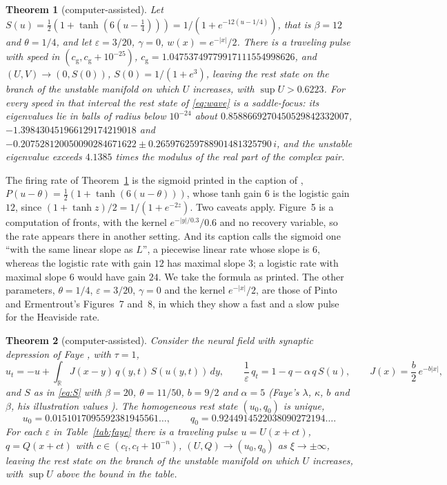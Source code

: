 \documentclass[11pt]{article}
\newtheorem{theorem}{Theorem}
\theoremstyle{definition}
\newcommand{\R}{\mathbb{R}}
\newcommand{\eps}{\varepsilon}
\begin{document}
\begin{theorem}[computer-assisted]\label{thm:gain12}
Let $S(u) = \frac12(1 + \tanh(6(u - \frac14))) = 1/(1 + e^{-12(u - 1/4)})$, that is $\beta = 12$ and $\theta = 1/4$, and let $\eps = 3/20$, $\gamma = 0$, $w(x) = e^{-|x|}/2$. There is a traveling pulse with speed in $(c_{\mathrm g}, c_{\mathrm g} + 10^{-25})$, $c_{\mathrm g} = 1.04753749779917111554998626$, and $(U, V) \to (0, S(0))$, $S(0) = 1/(1 + e^3)$, leaving the rest state on the branch of the unstable manifold on which $U$ increases, with $\sup U > 0.6223$. For every speed in that interval the rest state of \eqref{eq:wave} is a saddle-focus: its eigenvalues lie in balls of radius below $10^{-24}$ about $0.8588669270450529842332007$, $-1.398430451966129174219018$ and $-0.207528120050090284671622 \pm 0.265976259788901481325790\,i$, and the unstable eigenvalue exceeds $4.1385$ times the modulus of the real part of the complex pair.
\end{theorem}

The firing rate of Theorem~\ref{thm:gain12} is the sigmoid printed in the caption of \cite[Fig.~5, p.~215]{pe2001}, $P(u - \theta) = \frac12(1 + \tanh(6(u - \theta)))$, whose tanh gain $6$ is the logistic gain $12$, since $(1 + \tanh z)/2 = 1/(1 + e^{-2z})$. Two caveats apply. Figure~5 is a computation of fronts, with the kernel $e^{-|y|/0.3}/0.6$ and no recovery variable, so the rate appears there in another setting. And its caption calls the sigmoid one ``with the same linear slope as $L$'', a piecewise linear rate whose slope is $6$, whereas the logistic rate with gain $12$ has maximal slope $3$; a logistic rate with maximal slope $6$ would have gain $24$. We take the formula as printed. The other parameters, $\theta = 1/4$, $\eps = 3/20$, $\gamma = 0$ and the kernel $e^{-|x|}/2$, are those of Pinto and Ermentrout's Figures~7 and~8, in which they show a fast and a slow pulse for the Heaviside rate.

\begin{theorem}[computer-assisted]\label{thm:faye}
Consider the neural field with synaptic depression of Faye \cite[eqs.~(2.1)--(2.3)]{faye2013}, with $\tau = 1$,
\begin{equation}\label{eq:faye}
  u_t = -u + \int_\R J(x - y)\, q(y, t)\, S(u(y, t))\, dy, \qquad \frac{1}{\eps}\, q_t = 1 - q - \alpha\, q\, S(u), \qquad J(x) = \frac b2\, e^{-b|x|},
\end{equation}
and $S$ as in \eqref{eq:S} with $\beta = 20$, $\theta = 11/50$, $b = 9/2$ and $\alpha = 5$ (Faye's $\lambda$, $\kappa$, $b$ and $\beta$, his illustration values \cite[Sect.~3.2 and Figs.~1, 4 and~7]{faye2013}). The homogeneous rest state $(u_0, q_0)$ is unique,
\[
  u_0 = 0.0151017095592381945561\ldots, \qquad q_0 = 0.9244914522038090272194\ldots .
\]
For each $\eps$ in Table~\ref{tab:faye} there is a traveling pulse $u = U(x + ct)$, $q = Q(x + ct)$ with $c \in (c_{\mathrm f}, c_{\mathrm f} + 10^{-n})$, $(U, Q) \to (u_0, q_0)$ as $\xi \to \pm\infty$, leaving the rest state on the branch of the unstable manifold on which $U$ increases, with $\sup U$ above the bound in the table.
\end{theorem}
\end{document}
